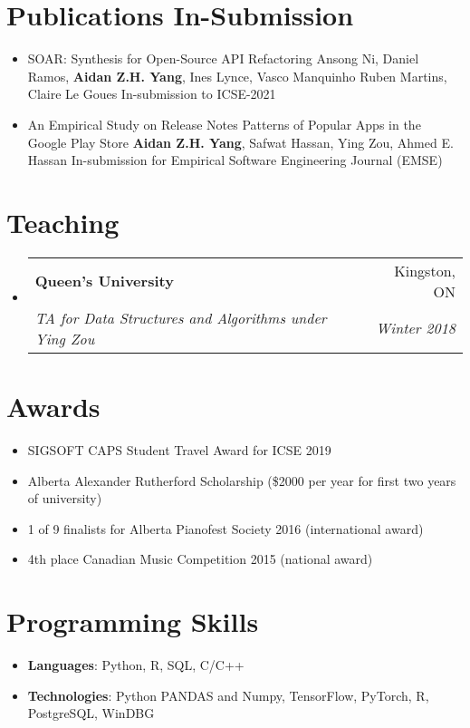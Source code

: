 \documentclass[letterpaper,11pt]{article}
\makeatletter
\newcommand{\resumeSubheading}[4]{
  \vspace{-1pt}\item
    \begin{tabular*}{0.97\textwidth}{l@{\extracolsep{\fill}}r}
      \textbf{#1} & #2 \\
      \textit{\small#3} & \textit{\small #4} \\
    \end{tabular*}\vspace{-5pt}
}
\newcommand{\resumeSubHeadingListStart}{\begin{itemize}[leftmargin=*]}
\newcommand{\resumeSubHeadingListEnd}{\end{itemize}}
\makeatother
\begin{document}
\section{Publications In-Submission}
\resumeSubHeadingListStart

\item{
	{SOAR: Synthesis for Open-Source API Refactoring \newline
		Ansong Ni, Daniel Ramos, \textbf{Aidan Z.H. Yang}, Ines Lynce, Vasco Manquinho Ruben Martins, Claire Le Goues\newline
		In-submission to ICSE-2021
	}
}
\item{
	{An Empirical Study on Release Notes Patterns of Popular Apps in the Google Play Store \newline
		\textbf{Aidan Z.H. Yang}, Safwat Hassan, Ying Zou, Ahmed E. Hassan \newline
		In-submission for Empirical Software Engineering Journal (EMSE)
	}
}
\resumeSubHeadingListEnd

\section{Teaching}
\resumeSubHeadingListStart

\resumeSubheading
{Queen's University}{Kingston, ON}
{TA for Data Structures and Algorithms under Ying Zou}{Winter 2018}
\resumeSubHeadingListEnd

\section{Awards}
\resumeSubHeadingListStart

\item{SIGSOFT CAPS Student Travel Award for ICSE 2019}

\item{Alberta Alexander Rutherford Scholarship (\$2000 per year for first two years of university)	
}

\item{1 of 9 finalists for Alberta Pianofest Society 2016 (international award)	
}

\item{4th place Canadian Music Competition 2015 (national award)
}

\resumeSubHeadingListEnd


\section{Programming Skills}
 \resumeSubHeadingListStart
   \item{
        \textbf{Languages}{: Python, R, SQL, C/C++}
    }
    \item{
        \textbf{Technologies}{: Python PANDAS and Numpy, TensorFlow, PyTorch, R, PostgreSQL, WinDBG}
    }
 \resumeSubHeadingListEnd
\end{document}
